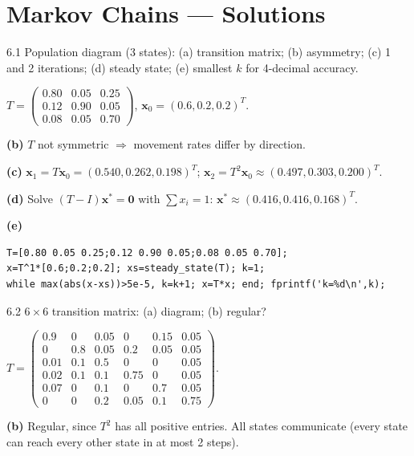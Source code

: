 \chapter{Markov Chains --- Solutions}

\begin{exercise}{6.1}
Population diagram (3 states): (a) transition matrix; (b) asymmetry; (c) 1 and 2 iterations; (d) steady state; (e) smallest $k$ for 4-decimal accuracy.
\end{exercise}
\begin{solution}
$T=\begin{pmatrix}0.80&0.05&0.25\\0.12&0.90&0.05\\0.08&0.05&0.70\end{pmatrix}$, $\mathbf{x}_0=(0.6,0.2,0.2)^T$.

\textbf{(b)} $T$ not symmetric $\Rightarrow$ movement rates differ by direction.

\textbf{(c)} $\mathbf{x}_1=T\mathbf{x}_0=(0.540,0.262,0.198)^T$; $\mathbf{x}_2=T^2\mathbf{x}_0\approx(0.497,0.303,0.200)^T$.

\textbf{(d)} Solve $(T-I)\mathbf{x}^*=\mathbf{0}$ with $\sum x_i=1$:
$\mathbf{x}^*\approx(0.416,0.416,0.168)^T$.

\textbf{(e)}
\begin{lstlisting}
T=[0.80 0.05 0.25;0.12 0.90 0.05;0.08 0.05 0.70];
x=T^1*[0.6;0.2;0.2]; xs=steady_state(T); k=1;
while max(abs(x-xs))>5e-5, k=k+1; x=T*x; end; fprintf('k=%d\n',k);
\end{lstlisting}
\end{solution}

\begin{exercise}{6.2}
$6\times6$ transition matrix: (a) diagram; (b) regular?
\end{exercise}
\begin{solution}
$T=\begin{pmatrix}0.9&0&0.05&0&0.15&0.05\\
0&0.8&0.05&0.2&0.05&0.05\\
0.01&0.1&0.5&0&0&0.05\\
0.02&0.1&0.1&0.75&0&0.05\\
0.07&0&0.1&0&0.7&0.05\\
0&0&0.2&0.05&0.1&0.75\end{pmatrix}$.

\textbf{(b)} Regular, since $T^2$ has all positive entries. All states communicate (every state can reach every other state in at most 2 steps).
\end{solution}

